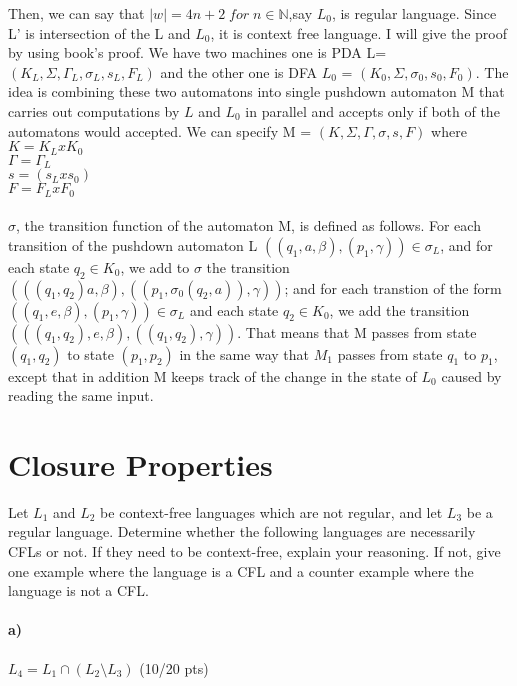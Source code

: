 \documentclass[a4paper,12pt]{article}
\begin{document}
\begin{tcolorbox}
Then, we can say that $|w|=4n+2 \; for\; n\in \mathbb{N}$,say $L_0$, is regular language. Since L' is intersection of the L and  $L_0$, it is context free language.
I will give the proof by using book's proof.
We have two machines one is PDA L=$(K_L,\Sigma, \Gamma_L, \sigma_L,s_L,F_L)$ and the other one is DFA $L_0$ = $(K_0,\Sigma, \sigma_0,s_0,F_0)$. The idea is combining these two automatons into single pushdown automaton M that carries out computations by $L$ and $L_0$ in parallel and accepts only if both of the automatons would accepted. We can specify M = $(K,\Sigma,\Gamma,\sigma,s,F)$ where \\ $K = K_LxK_0$ \\ $\Gamma = \Gamma_L$ \\ $s = (s_Lxs_0)$ \\ $F = F_LxF_0$ \\ \\
$\sigma$, the transition function of the automaton M, is defined as follows. For each transition of the pushdown automaton L $((q_1,a,\beta ),(p_1,\gamma )) \in  \sigma_L $, and for each state $q_2 \in K_0 $, we add to $ \sigma $ the transition $(((q_1,q_2)a,\beta),((p_1,\sigma_0(q_2,a)),\gamma ))$; and for each transtion of the form $((q_1,e,\beta),(p_1,\gamma)) \in \sigma_L$ and each state $q_2 \in K_0$, we add the transition $(((q_1,q_2),e,\beta),((q_1,q_2),\gamma))$. That means that M passes from state $(q_1,q_2)$ to state $(p_1,p_2)$ in the same way that $M_1$ passes from state $q_1$ to $p_1$, except that in addition M keeps track of the change in the state of $L_0$ caused by reading the same input. 

\end{tcolorbox}






\newpage
\section{Closure Properties \hfill {}}

Let $L_1$ and $L_2$ be context-free languages which are not regular, and let $L_3$ be a regular language. Determine whether the following languages are necessarily CFLs or not. If they need to be context-free, explain your reasoning. If not, give one example where the language is a CFL and a counter example where the language is not a CFL. \\

\paragraph{a)} $L_4 = L_1 \cap (L_2 \setminus L_3)$ \hfill \small{(10/20 pts)} \\
\end{document}
